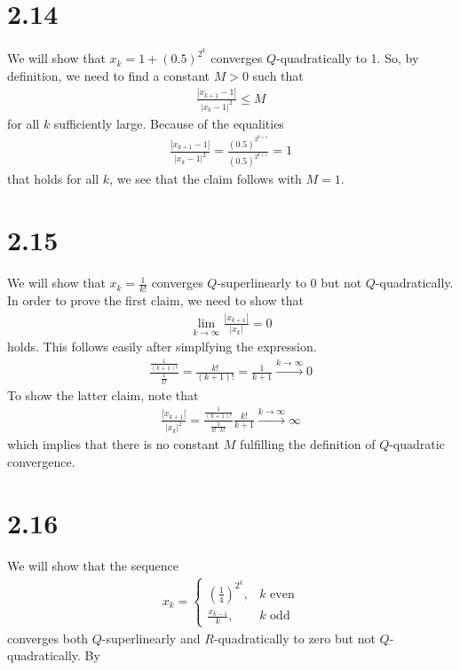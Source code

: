 \documentclass{article}
\begin{document}
\section{2.14}
We will show that $x_k=1+(0.5)^{2^k}$ converges $Q$-quadratically to 1. So, by definition, we need
to find a constant $M>0$ such that
\begin{align*}
\frac{|x_{k+1}-1|}{|x_k-1|^2}\leq M
\end{align*} 
for all $k$ sufficiently large. Because of the equalities
\begin{align*}
\frac{|x_{k+1}-1|}{|x_k-1|^2}=\frac{(0.5)^{2^{k+1}}}{(0.5)^{2^{k+1}}}=1
\end{align*}
that holds for all $k$, we see that the claim follows with $M=1$.  \par
\section{2.15}
We will show that $x_k=\frac{1}{k!}$ converges $Q$-superlinearly to 0 but not $Q$-quadratically.
In order to prove the first claim, we need to show  that
\begin{align*}
\lim_{k\rightarrow \infty}\frac{|x_{k+1}|}{|x_k|}=0
\end{align*}
holds. This follows easily after simplfying the expression.
\begin{align*}
\frac{\frac{1}{(k+1)!}}{\frac{1}{k!}}=\frac{k!}{(k+1)!}=\frac{1}{k+1}\xrightarrow{k \rightarrow \infty} 0
\end{align*}
To show the latter claim, note that 
\begin{align*}
\frac{|x_{k+1}|}{|x_k|^2}=\frac{\frac{1}{(k+1)!}}{\frac{1}{k!\cdot k!}}\frac{k!}{k+1}\xrightarrow{k\rightarrow \infty} \infty
\end{align*}
which implies that there is no constant $M$ fulfilling the definition of $Q$-quadratic convergence.\section{2.16}
We will show that the sequence
\begin{align*}
x_k=\begin{cases}\left(\frac{1}{4}\right)^{2^k}, & k \textrm{ even} \\
                  \frac{x_{k-1}}{k}, & k \textrm{ odd} \end{cases}
\end{align*}
converges both $Q$-superlinearly and $R$-quadratically to zero but not $Q$-quadratically.
By
\end{document}

